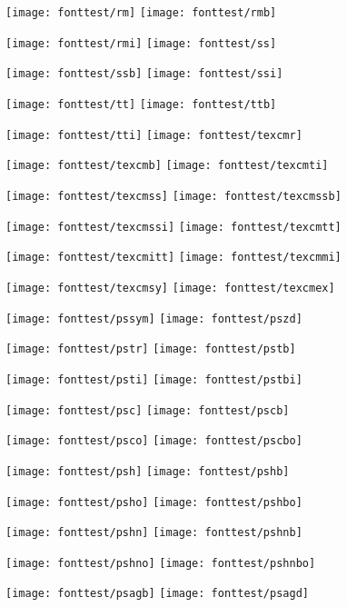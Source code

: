 

\texttt{[image: fonttest/rm]}\hfill
\texttt{[image: fonttest/rmb]}

\texttt{[image: fonttest/rmi]}\hfill
\texttt{[image: fonttest/ss]}

\texttt{[image: fonttest/ssb]}\hfill
\texttt{[image: fonttest/ssi]}

\texttt{[image: fonttest/tt]}\hfill
\texttt{[image: fonttest/ttb]}

\texttt{[image: fonttest/tti]}\hfill
\texttt{[image: fonttest/texcmr]}

\texttt{[image: fonttest/texcmb]}\hfill
\texttt{[image: fonttest/texcmti]}

\texttt{[image: fonttest/texcmss]}\hfill
\texttt{[image: fonttest/texcmssb]}

\texttt{[image: fonttest/texcmssi]}\hfill
\texttt{[image: fonttest/texcmtt]}

\texttt{[image: fonttest/texcmitt]}\hfill
\texttt{[image: fonttest/texcmmi]}

\texttt{[image: fonttest/texcmsy]}\hfill
\texttt{[image: fonttest/texcmex]}

\texttt{[image: fonttest/pssym]}\hfill
\texttt{[image: fonttest/pszd]}


\texttt{[image: fonttest/pstr]}\hfill
\texttt{[image: fonttest/pstb]}

\texttt{[image: fonttest/psti]}\hfill
\texttt{[image: fonttest/pstbi]}

\texttt{[image: fonttest/psc]}\hfill
\texttt{[image: fonttest/pscb]}

\texttt{[image: fonttest/psco]}\hfill
\texttt{[image: fonttest/pscbo]}

\texttt{[image: fonttest/psh]}\hfill
\texttt{[image: fonttest/pshb]}

\texttt{[image: fonttest/psho]}\hfill
\texttt{[image: fonttest/pshbo]}


\texttt{[image: fonttest/pshn]}\hfill
\texttt{[image: fonttest/pshnb]}

\texttt{[image: fonttest/pshno]}\hfill
\texttt{[image: fonttest/pshnbo]}

\texttt{[image: fonttest/psagb]}\hfill
\texttt{[image: fonttest/psagd]}

